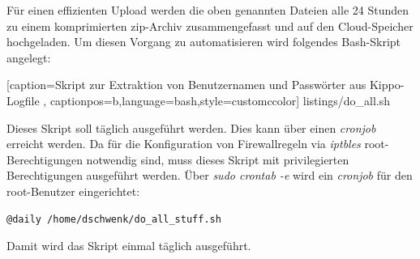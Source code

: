 Für einen effizienten Upload werden die oben genannten Dateien alle 24 Stunden zu einem komprimierten zip-Archiv zusammengefasst und auf den Cloud-Speicher hochgeladen. Um diesen Vorgang zu automatisieren wird folgendes Bash-Skript angelegt:


    [caption={Skript zur Extraktion von Benutzernamen und Passwörter aus Kippo-Logfile}
       \label{lst:mitm_onmsg},
       captionpos=b,language=bash,style=customccolor]
 {listings/do_all.sh}
 
Dieses Skript soll täglich ausgeführt werden. Dies kann über einen \textit{cronjob} erreicht werden. Da für die Konfiguration von Firewallregeln via \textit{iptbles} root-Berechtigungen notwendig sind, muss dieses Skript mit privilegierten Berechtigungen ausgeführt werden. Über \textit{sudo crontab -e} wird ein \textit{cronjob} für den root-Benutzer eingerichtet:

\begin{lstlisting}[style=customc]
@daily /home/dschwenk/do_all_stuff.sh
\end{lstlisting}

Damit wird das Skript einmal täglich ausgeführt.